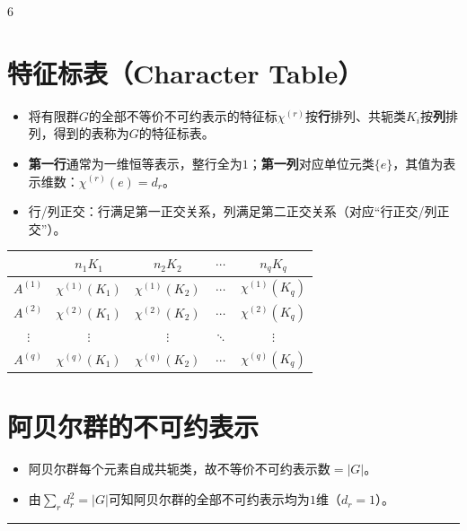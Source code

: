 \documentclass[landscape]{article}
\begin{document}
\begin{multicols*}{6}
\section*{特征标表（Character Table）}
\begin{itemize}
  \item 将有限群$G$的全部不等价不可约表示的特征标$\chi^{(r)}$按\textbf{行}排列、共轭类$K_i$按\textbf{列}排列，得到的表称为$G$的特征标表。
  \item \textbf{第一行}通常为一维恒等表示，整行全为$1$；\textbf{第一列}对应单位元类$\{e\}$，其值为表示维数：$\chi^{(r)}(e)=d_r$。
  \item 行/列正交：行满足第一正交关系，列满足第二正交关系（对应“行正交/列正交”）。
\end{itemize}
\begin{tabular}{c|cccc}
  & $n_1 K_1$ & $n_2 K_2$ & $\cdots$ & $n_q K_q$ \\
 \hline
 $A^{(1)}$ & $\chi^{(1)}(K_1)$ & $\chi^{(1)}(K_2)$ & $\cdots$ & $\chi^{(1)}(K_q)$ \\
 $A^{(2)}$ & $\chi^{(2)}(K_1)$ & $\chi^{(2)}(K_2)$ & $\cdots$ & $\chi^{(2)}(K_q)$ \\
 $\vdots$ & $\vdots$ & $\vdots$ & $\ddots$ & $\vdots$ \\
 $A^{(q)}$ & $\chi^{(q)}(K_1)$ & $\chi^{(q)}(K_2)$ & $\cdots$ & $\chi^{(q)}(K_q)$ \\
 \end{tabular}
\section*{阿贝尔群的不可约表示}
\begin{itemize}
  \item 阿贝尔群每个元素自成共轭类，故不等价不可约表示数$=|G|$。
  \item 由$\sum_r d_r^2=|G|$可知阿贝尔群的全部不可约表示均为$1$维（$d_r=1$）。
\end{itemize}
\noindent\textcolor{red}{\rule{\linewidth}{1pt}}

\end{multicols*}
\end{document}
